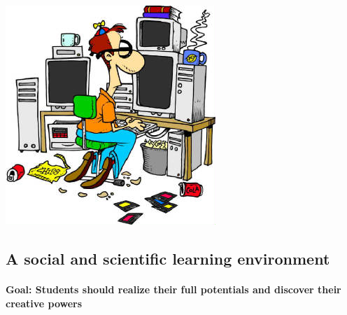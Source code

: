 \documentclass[%
twoside,                 %
final,                   %
10pt]{article}
\begin{document}



\centerline{\includegraphics[width=1.0\linewidth]{fig-future/computer_nerd2.jpg}}




\subsection{A social and scientific learning environment}


\paragraph{}
\textbf{Goal: Students should realize their full potentials and discover their creative powers}
\end{document}
